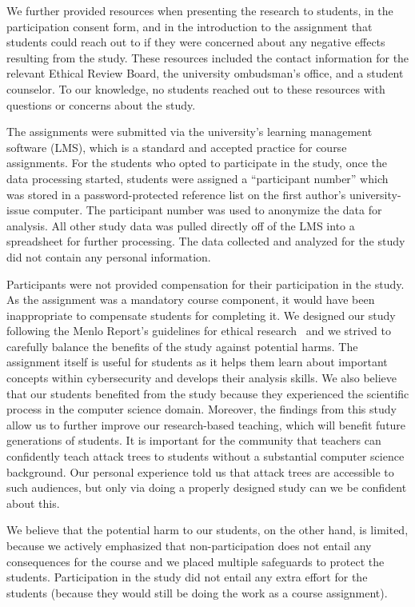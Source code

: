 We further provided resources when presenting the research to students, in the participation consent form, and in the introduction to the assignment that students could reach out to if they were concerned about any negative effects resulting from the study. These resources included the contact information for the relevant Ethical Review Board, the university ombudsman's office, and a student counselor. To our knowledge, no students reached out to these resources with questions or concerns about the study.

The assignments were submitted via the university's learning management software (LMS), which is a standard and accepted practice for course assignments. For the students who opted to participate in the study, once the data processing started, students were assigned a ``participant number'' which was stored in a password-protected reference list on the first author's university-issue computer. The participant number was used to anonymize the data for analysis. All other study data was pulled directly off of the LMS into a spreadsheet for further processing. The data collected and analyzed for the study did not contain any personal information.


Participants were not provided compensation for their participation in the study. As the assignment was a mandatory course component, it would have been inappropriate to compensate students for completing it. We designed our study following the Menlo Report's guidelines for ethical research~\cite{kenneallyMenloReportEthical2012} and we strived to carefully balance the benefits of the study against potential harms. The assignment itself is useful for students as it helps them learn about important concepts within cybersecurity and develops their analysis skills. We also believe that our students benefited from the study because they experienced the scientific process in the computer science domain. Moreover, the findings from this study allow us to further improve our research-based teaching, which will benefit future generations of students. It is important for the community that teachers can confidently teach attack trees to students without a substantial computer science background. Our personal experience told us that attack trees are accessible to such audiences, but only via doing a properly designed study can we be confident about this.  

We believe that the potential harm to our students, on the other hand, is limited, because we actively emphasized that non-participation does not entail any consequences for the course and we placed multiple safeguards to protect the students. Participation in the study did not entail any extra effort for the students (because they would still be doing the work as a course assignment). 

